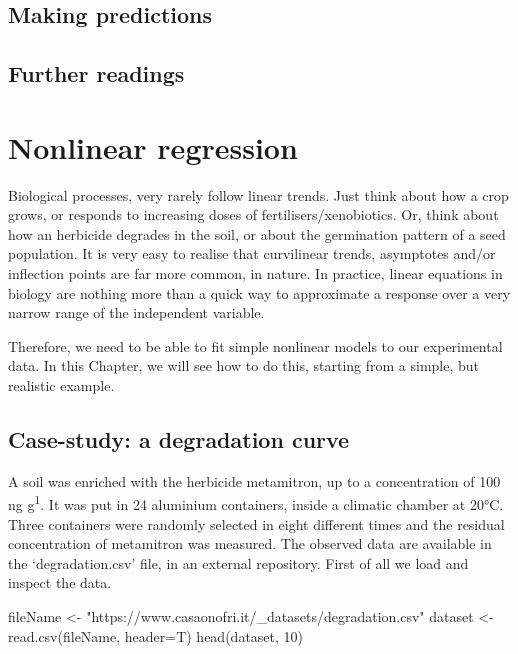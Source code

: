 \documentclass[a4paper,12pt,oneside]{book}
\newenvironment{Shaded}{\begin{snugshade}}{\end{snugshade}}
\newcommand{\DecValTok}[1]{#1}
\newcommand{\StringTok}[1]{#1}
\newcommand{\OtherTok}[1]{#1}
\newcommand{\FunctionTok}[1]{#1}
\newcommand{\AttributeTok}[1]{#1}
\newcommand{\NormalTok}[1]{#1}
\begin{document}
\hypertarget{making-predictions}{%
\section{Making predictions}\label{making-predictions}}

\hypertarget{further-readings-10}{%
\section{Further readings}\label{further-readings-10}}

\hypertarget{nonlinear-regression}{%
\chapter{Nonlinear regression}\label{nonlinear-regression}}

Biological processes, very rarely follow linear trends. Just think about how a crop grows, or responds to increasing doses of fertilisers/xenobiotics. Or, think about how an herbicide degrades in the soil, or about the germination pattern of a seed population. It is very easy to realise that curvilinear trends, asymptotes and/or inflection points are far more common, in nature. In practice, linear equations in biology are nothing more than a quick way to approximate a response over a very narrow range of the independent variable.

Therefore, we need to be able to fit simple nonlinear models to our experimental data. In this Chapter, we will see how to do this, starting from a simple, but realistic example.

\hypertarget{case-study-a-degradation-curve}{%
\section{Case-study: a degradation curve}\label{case-study-a-degradation-curve}}

A soil was enriched with the herbicide metamitron, up to a concentration of 100 ng g\textsuperscript{1}. It was put in 24 aluminium containers, inside a climatic chamber at 20°C. Three containers were randomly selected in eight different times and the residual concentration of metamitron was measured. The observed data are available in the `degradation.csv' file, in an external repository. First of all we load and inspect the data.

\vspace{12pt}

\begin{Shaded}
\begin{Highlighting}[]
\NormalTok{fileName }\OtherTok{\textless{}{-}} \StringTok{"https://www.casaonofri.it/\_datasets/degradation.csv"}
\NormalTok{dataset }\OtherTok{\textless{}{-}} \FunctionTok{read.csv}\NormalTok{(fileName, }\AttributeTok{header=}\NormalTok{T)}
\FunctionTok{head}\NormalTok{(dataset, }\DecValTok{10}\NormalTok{)}
\end{Highlighting}
\end{Shaded}
\end{document}
